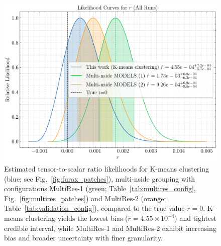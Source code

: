 \documentclass[fleqn,usenatbib]{mnras}
\begin{document}
\begin{figure}
    \centering
    \includegraphics[width=0.9\linewidth]{figures/r_likelihood_distribution.pdf}
    \caption{
    Estimated tensor-to-scalar ratio likelihoods for K-means clustering (blue; see Fig.~\protect\ref{fig:furax_patches}), multi-nside grouping with configurations MultiRes-1 (green; Table~\protect\ref{tab:multires_config}, Fig.~\protect\ref{fig:multires_patches}) and MultiRes-2 (orange; Table~\protect\ref{tab:validation_config}), compared to the true value \( r = 0 \). 
    K-means clustering yields the lowest bias (\( \hat{r} = 4.55 \times 10^{-4} \)) and tightest credible interval, while MultiRes-1 and MultiRes-2 exhibit increasing bias and broader uncertainty with finer granularity. 
    }
    
    \label{fig:r_likelihood_distribution}
\end{figure}
\end{document}
